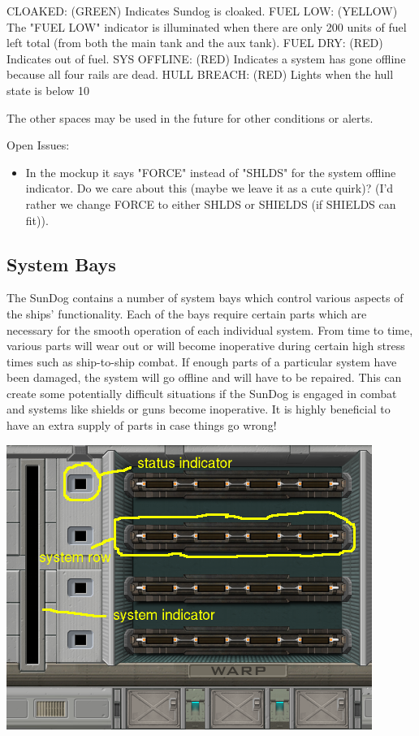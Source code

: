 \begin{itemize}
CLOAKED: (GREEN) Indicates Sundog is cloaked. 
FUEL LOW: (YELLOW) The "FUEL LOW" indicator is illuminated when there are only 200 units
of fuel left total (from both the main tank and the aux tank).
FUEL DRY: (RED) Indicates out of fuel. 
SYS OFFLINE: (RED) Indicates a system has gone offline because all four rails are dead. 
HULL BREACH: (RED) Lights when the hull state is below 10%

The other spaces may be used in the future for other conditions or alerts. 
 


Open Issues:
\begin{itemize}
\item In the mockup it says "FORCE" instead of "SHLDS" for the system
offline indicator.  Do we care about this (maybe we leave it as a cute
quirk)? (I'd rather we change FORCE to either SHLDS or SHIELDS (if SHIELDS can fit)). 
\end{itemize}

\subsection{System Bays}
The SunDog contains a number of system bays which control various aspects of
the ships' functionality.  Each of the bays require certain parts which are
necessary for the smooth operation of each individual system.  From time to
time, various parts will wear out or will become inoperative during certain
high stress times such as ship-to-ship combat.  If enough parts of a particular
system have been damaged, the system will go offline and will have to be
repaired.  This can create some potentially difficult situations if the
SunDog is engaged in combat and systems like shields or guns become
inoperative.  It is highly beneficial to have an extra supply of parts in
case things go wrong!

\includegraphics[scale=0.70]{images/interior-warp.png}


\end{itemize}
